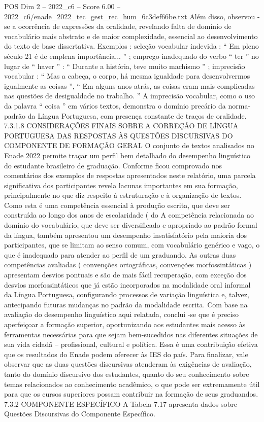 \begin{textsample}{POS Dim 2 – 2022\_c6 – Score 6.00 – 2022\_c6/enade\_2022\_tec\_gest\_rec\_hum\_6c3def66be.txt}
Além disso, observou -se a ocorrência de expressões da oralidade, revelando falta de domínio de vocabulário mais abstrato e de maior complexidade, essencial ao desenvolvimento do texto de base dissertativa.
Exemplos : seleção vocabular indevida : “ Em pleno século 21 é de emplena importância... ” ; emprego inadequado do verbo “ ter ” no lugar de “ haver ” : “ Durante a história, teve muito machismo ” ; imprecisão vocabular : “ Mas a cabeça, o corpo, há mesma igualdade para desenvolvermos igualmente as coisas ”, “ Em alguns anos atrás, as coisas eram mais complicadas nas questões de desigualdade no trabalho. ” A imprecisão vocabular, como o uso da palavra “ coisa ” em vários textos, demonstra o domínio precário da norma-padrão da Língua Portuguesa, com presença constante de traços de oralidade. 7.3.1.8 CONSIDERAÇÕES FINAIS SOBRE A CORREÇÃO DE LÍNGUA PORTUGUESA DAS RESPOSTAS ÀS QUESTÕES DISCURSIVAS DO COMPONENTE DE FORMAÇÃO GERAL O conjunto de textos analisados no Enade 2022 permite traçar um perfil bem detalhado do desempenho linguístico do estudante brasileiro de graduação.
Conforme ficou comprovado nos comentários dos exemplos de respostas apresentados neste relatório, uma parcela significativa dos participantes revela lacunas importantes em sua formação, principalmente no que diz respeito à estruturação e à organização de textos.
Como esta é uma competência essencial à produção escrita, que deve ser construída ao longo dos anos de escolaridade ( do A competência relacionada ao domínio do vocabulário, que deve ser diversificado e apropriado ao padrão formal da língua, também apresentou um desempenho insatisfatório pela maioria dos participantes, que se limitam ao senso comum, com vocabulário genérico e vago, o que é inadequado para atender ao perfil de um graduando.
As outras duas competências avaliadas ( convenções ortográficas, convenções morfossintáticas ) apresentam desvios pontuais e são de mais fácil recuperação, com exceção dos desvios morfossintáticos que já estão incorporados na modalidade oral informal da Língua Portuguesa, configurando processos de variação linguística e, talvez, antecipando futuras mudanças no padrão da modalidade escrita.
Com base na avaliação do desempenho linguístico aqui relatada, conclui -se que é preciso aperfeiçoar a formação superior, oportunizando aos estudantes mais acesso às ferramentas necessárias para que sejam bem-sucedidos nas diferentes situações de sua vida cidadã – profissional, cultural e política.
Essa é uma contribuição efetiva que os resultados do Enade podem oferecer às IES do país.
Para finalizar, vale observar que as duas questões discursivas atenderam às exigências de avaliação, tanto do domínio discursivo dos estudantes, quanto do seu conhecimento sobre temas relacionados ao conhecimento acadêmico, o que pode ser extremamente útil para que os cursos superiores possam contribuir na formação de seus graduandos. 7.3.2 COMPONENTE ESPECÍFICO A Tabela 7.17 apresenta dados sobre Questões Discursivas do Componente Específico.

\end{textsample}
